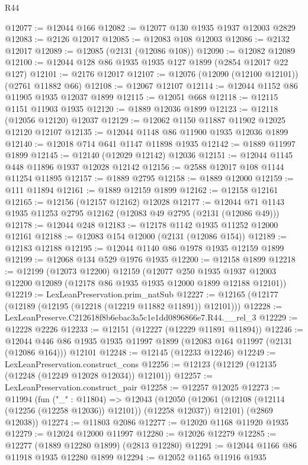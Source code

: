 \begin{lexlean}{R44}
\begin{coremodule}
@12077 := @12044 @166
@12082 := @12077 @130 @1935 @1937 @12003 @2829
@12083 := @2126 @12017
@12085 := @12083 @108 @12003
@12086 := @2132 @12017
@12089 := @12085 (@2131 (@12086 @108))
@12090 := @12082 @12089
@12100 := @12044 @128 @86 @1935 @1935 @127 @1899 (@2854 @12017 @22 @127)
@12101 := @2176 @12017
@12107 := @12076 (@12090 (@12100 @12101)) (@2761 @11882 @66)
@12108 := @12067 @12107
@12114 := @12044 @1152 @86 @11905 @1935 @12037 @1899
@12115 := @12051 @668
@12118 := @12115 @1151 @11903 @1935
@12120 := @1889 @12036 @1899
@12123 := @12118 (@12056 @12120) @12037
@12129 := @12062 @1150 @11887 @11902 @12025 @12120 @12107
@12135 := @12044 @1148 @86 @11900 @1935 @12036 @1899
@12140 := @12018 @714 @641 @1147 @11898 @1935
@12142 := @1889 @11997 @1899
@12145 := @12140 (@12029 @12142) @12036
@12151 := @12044 @1145 @448 @11896 @1937 @12028 @12142
@12156 := @2588 @12017 @108 @1144 @11254 @11895
@12157 := @1889 @2795
@12158 := @1889 @12000
@12159 := @111 @11894
@12161 := @1889 @12159 @1899
@12162 := @12158 @12161
@12165 := @12156 (@12157 @12162) @12028
@12177 := @12044 @71 @1143 @1935 @11253 @2795 @12162 (@12083 @49 @2795 (@2131 (@12086 @49)))
@12178 := @12044 @248
@12183 := @12178 @1142 @1935 @11252 @12000 @12161
@12188 := @12083 @154 @12000 (@2131 (@12086 @154))
@12189 := @12183 @12188
@12195 := @12044 @1140 @86 @1978 @1935 @12159 @1899
@12199 := @12068 @134 @529 @1976 @1935
@12200 := @12158 @1899
@12218 := @12199
    (@12073 @12200)
    @12159
    (@12077
      @250
      @1935
      @1937
      @12003
      @12200
      @12089
      (@12178 @86 @1935 @1935 @12000 @1899 @12188 @12101))
@12219 := LexLeanPreservation.prim_natSub
@12227 := @12165 (@12177 (@12189 (@12195 (@12218 (@12219 @11882 @11891)) @12101)))
@12228 := LexLeanPreserve.C212618f8b6ebac3a5c1e1dd0896866e7.R44.__rel_3
@12229 := @12228 @2226
@12233 := @12151 (@12227 (@12229 @11891 @11894))
@12246 := @12044 @446 @86 @1935 @1935 @11997 @1899 (@12083 @164 @11997 (@2131 (@12086 @164))) @12101
@12248 := @12145 (@12233 @12246)
@12249 := LexLeanPreservation.construct_cons
@12256 := @12123 (@12129 (@12135 (@12248 (@12249 @12028 @12034)) @12101))
@12257 := LexLeanPreservation.construct_pair
@12258 := @12257 @12025
@12273 := @11994
    (fun ("_" : @11804) =>
    @12043
      (@12050 (@12061 (@12108 (@12114 (@12256 (@12258 @12036)) @12101)) (@12258 @12037)) @12101)
      (@2869 @12038))
@12274 := @11803 @2086
@12277 := @12020 @1168 @11920 @1935
@12279 := @12024 @12000 @11997
@12280 := @12026 @12279
@12285 := @12277 (@1889 @12280 @1899) (@2813 @12280)
@12291 := @12044 @1166 @86 @11918 @1935 @12280 @1899
@12294 := @12052 @1165 @11916 @1935

\end{coremodule}
\end{lexlean}
